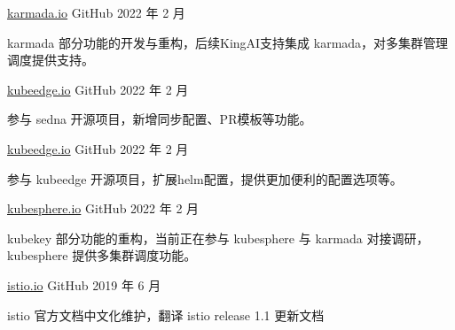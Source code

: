 

\begin{cventries}

  \cventry
    {} %
    {\href{https://github.com/karmada-io/karmada}{karmada.io}} %
    {GitHub} %
    {2022 年 2 月} %
    {
      \begin{cvitems} %
        \item karmada 部分功能的开发与重构，后续KingAI支持集成 karmada，对多集群管理调度提供支持。
      \end{cvitems}
    }

    \cventry
    {} %
    {\href{https://github.com/kubeedge/sedna}{kubeedge.io}} %
    {GitHub} %
    {2022 年 2 月} %
    {
      \begin{cvitems} %
        \item 参与 sedna 开源项目，新增同步配置、PR模板等功能。
      \end{cvitems}
    }

    \cventry
    {} %
    {\href{https://github.com/kubeedge/kubeedge}{kubeedge.io}} %
    {GitHub} %
    {2022 年 2 月} %
    {
      \begin{cvitems} %
        \item 参与 kubeedge 开源项目，扩展helm配置，提供更加便利的配置选项等。
      \end{cvitems}
    }

    \cventry
    {} %
    {\href{https://github.com/kubesphere/kubekey}{kubesphere.io}} %
    {GitHub} %
    {2022 年 2 月} %
    {
      \begin{cvitems} %
        \item kubekey 部分功能的重构，当前正在参与 kubesphere 与 karmada 对接调研，kubesphere 提供多集群调度功能。
      \end{cvitems}
    }

  \cventry
    {} %
    {\href{https://github.com/istio/istio.io}{istio.io}} %
    {GitHub} %
    {2019 年 6 月} %
    {
      \begin{cvitems} %
        \item istio 官方文档中文化维护，翻译 istio release 1.1 更新文档
      \end{cvitems}
    }


\end{cventries}
